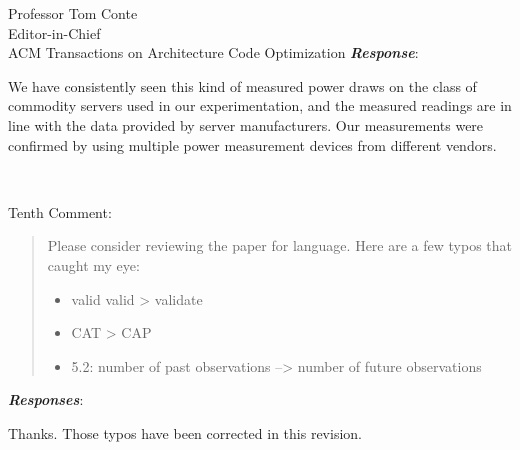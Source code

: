 \documentclass[10pt]{letter} %
\newenvironment{rviewcomment}
{~\\%
\begin{bfseries}}
{\end{bfseries}}
\newcommand{\rviewresponse}{\textbf{\textit{Response}}:}
\newcommand{\rviewresponses}{\textbf{\textit{Responses}}:}
\begin{document}
\begin{letter}{Professor Tom Conte \\
Editor-in-Chief \\
ACM Transactions on Architecture Code Optimization }
\rviewresponse

We have consistently seen this kind of measured power draws on the class
of commodity servers used in our experimentation, and the measured
readings are in line with the data provided by server
manufacturers. Our measurements were confirmed by using multiple power
measurement devices from different vendors.

\begin{rviewcomment}
  Tenth Comment:
\end{rviewcomment}
\begin{quote}
\begin{itshape}
Please consider reviewing the paper for language. Here are a few typos
that caught my eye:
\begin{itemize}
\item valid valid \verb --> validate
\item CAT \verb --> CAP
\item 5.2: number of past observations --> number of future observations
\end{itemize}
\end{itshape}
\end{quote}

\rviewresponses

Thanks.  Those typos have been corrected in this revision.


\clearpage



\end{letter}
\end{document}
